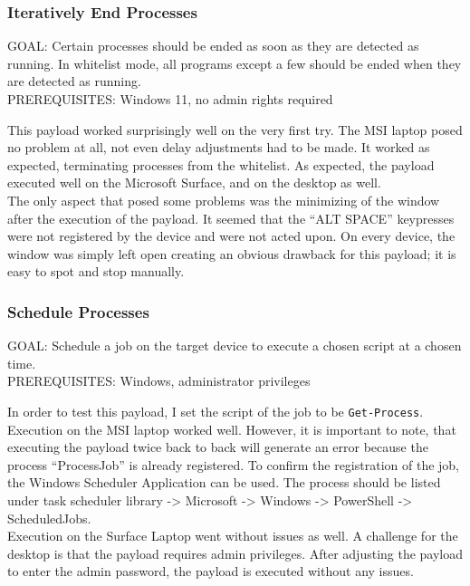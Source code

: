 \subsubsection{Iteratively End Processes}



GOAL: Certain processes should be ended as soon as they are detected as running. In whitelist mode, all programs except a few should be ended when they are detected as running.\\
PREREQUISITES: Windows 11, no admin rights required


This payload worked surprisingly well on the very first try. The MSI laptop posed no problem at all, not even delay adjustments had to be made. It worked as expected, terminating processes from the whitelist. As expected, the payload executed well on the Microsoft Surface, and on the desktop as well. \\
The only aspect that posed some problems was the minimizing of the window after the execution of the payload. It seemed that the ``ALT SPACE'' keypresses were not registered by the device and were not acted upon. On every device, the window was simply left open creating an obvious drawback for this payload; it is easy to spot and stop manually. 

\subsubsection{Schedule Processes}

GOAL: Schedule a job on the target device to execute a chosen script at a chosen time. \\
PREREQUISITES: Windows, administrator privileges

In order to test this payload, I set the script of the job to be \verb|Get-Process|. Execution on the MSI laptop worked well. However, it is important to note, that executing the payload twice back to back will generate an error because the process ``ProcessJob'' is already registered. To confirm the registration of the job, the Windows Scheduler Application can be used. The process should be listed under task scheduler library -> Microsoft -> Windows -> PowerShell -> ScheduledJobs. \\
Execution on the Surface Laptop went without issues as well. A challenge for the desktop is that the payload requires admin privileges. After adjusting the payload to enter the admin password, the payload is executed without any issues. 

